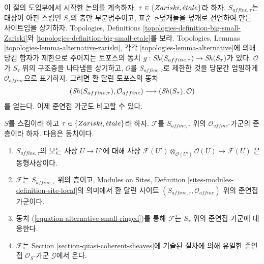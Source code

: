 \noindent
이 절의 도입부에서 시작한 논의를 계속하자.
$\tau \in \{Zariski, {\acute{e}tale}\}$라 하자. $S_{affine, \tau}$는 대상이
아핀 스킴인 $S_\tau$의 충만 부분범주이고, 표준 $\tau$-덮개들을 덮개로
선언하여 만든 사이트임을 상기하자. Topologies, Definitions
\ref{topologies-definition-big-small-Zariski}와
\ref{topologies-definition-big-small-etale}를 보라.
Topologies, Lemmas \ref{topologies-lemma-alternative-zariski}, 각각
\ref{topologies-lemma-alternative}에 의해 당김 함자가 제한으로 주어지는
토포스의 동치 $g : \mathop{\mathit{Sh}}\nolimits(S_{affine, \tau}) \to \mathop{\mathit{Sh}}\nolimits(S_\tau)$가 있다.
$\mathcal{O}$가 $S_\tau$ 위의 구조층을 나타냄을 상기하고,
$\mathcal{O}$를 $S_{affine, \tau}$로 제한한 것을 당분간 엄밀하게
$\mathcal{O}_{affine}$으로 표기하자. 그러면 환 달린 토포스의 동치
\begin{equation}
\label{equation-alternative-small-ringed}
(\mathop{\mathit{Sh}}\nolimits(S_{affine, \tau}), \mathcal{O}_{affine})
\longrightarrow
(\mathop{\mathit{Sh}}\nolimits(S_\tau), \mathcal{O})
\end{equation}
를 얻는다. 이제 준연접 가군도 비교할 수 있다.

\begin{lemma}
\label{lemma-quasi-coherent-alternative-small}
$S$를 스킴이라 하고 $\tau \in \{Zariski, {\acute{e}tale}\}$라 하자.
$\mathcal{F}$를 $S_{affine, \tau}$ 위의 $\mathcal{O}_{affine}$-가군의
준층이라 하자. 다음은 동치이다.
\begin{enumerate}
\item $S_{affine, \tau}$의 모든 사상 $U \to U'$에 대해 사상
$\mathcal{F}(U') \otimes_{\mathcal{O}(U')} \mathcal{O}(U) \to \mathcal{F}(U)$
은 동형사상이다.
\item $\mathcal{F}$는 $S_{affine, \tau}$ 위의 층이고, Modules on Sites,
Definition \ref{sites-modules-definition-site-local}의 의미에서 환 달린 사이트
$(S_{affine, \tau}, \mathcal{O}_{affine})$ 위의 준연접 가군이다.
\item 동치 (\ref{equation-alternative-small-ringed})를 통해
$\mathcal{F}$는 $S_\tau$ 위의 준연접 가군에 대응한다.
\item $\mathcal{F}$는 Section \ref{section-quasi-coherent-sheaves}에 기술된
절차에 의해 유일한 준연접 $\mathcal{O}_S$-가군 $\mathcal{G}$에서 온다.
\end{enumerate}
\end{lemma}

